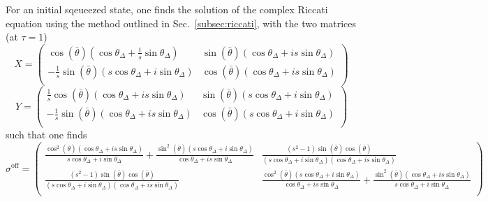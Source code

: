 \documentclass[%
reprint,
superscriptaddress,
nofootinbib,
 amsmath,amssymb,
prx,
floatfix,
]{revtex4-2}
\begin{document}
For an initial sqeueezed state, one finds the solution of the complex Riccati equation using the method outlined in Sec.~\ref{subsec:riccati}, with the two matrices (at $\tau = 1$)
\begin{equation}
    X = \left(
\begin{array}{cc}
 \cos (\bar{\theta}) \left(\cos \theta_\Delta +\frac{i}{s} \sin \theta_\Delta \right) & \sin (\bar{\theta}) (\cos \theta_\Delta +i s \sin \theta_\Delta ) \\
 -\frac{1}{s} \sin (\bar{\theta}) (s \cos \theta_\Delta +i \sin \theta_\Delta ) & \cos (\bar{\theta}) (\cos \theta_\Delta +i s \sin \theta_\Delta ) \\
\end{array}
\right)\nonumber
\end{equation}
\begin{equation}
   Y =  \left(
\begin{array}{cc}
 \frac{1}{s}\cos (\bar{\theta}) (\cos \theta_\Delta +i s \sin \theta_\Delta ) & \sin (\bar{\theta}) (s \cos \theta_\Delta +i \sin \theta_\Delta ) \\
 -\frac{1}{s}\sin (\bar{\theta}) (\cos \theta_\Delta +i s \sin \theta_\Delta ) & \cos (\bar{\theta}) (s \cos \theta_\Delta +i \sin \theta_\Delta ) \\
\end{array}
\right)\nonumber
\end{equation}
such that one finds 
\begin{equation}
    \sigma^{\text{off}} = \left(
\begin{array}{cc}
 \frac{\cos ^2(\bar{\theta}) (\cos \theta_\Delta +i s \sin \theta_\Delta )}{s \cos \theta_\Delta +i \sin \theta_\Delta }+\frac{\sin ^2(\bar{\theta}) (s \cos \theta_\Delta +i \sin \theta_\Delta )}{\cos \theta_\Delta +i s \sin \theta_\Delta } & \frac{\left(s^2-1\right) \sin (\bar{\theta}) \cos (\bar{\theta})}{(s \cos \theta_\Delta +i \sin \theta_\Delta ) (\cos \theta_\Delta +i s \sin \theta_\Delta )} \\
 \frac{\left(s^2-1\right) \sin (\bar{\theta}) \cos (\bar{\theta})}{(s \cos \theta_\Delta +i \sin \theta_\Delta ) (\cos \theta_\Delta +i s \sin \theta_\Delta )} & \frac{\cos ^2(\bar{\theta}) (s \cos \theta_\Delta +i \sin \theta_\Delta )}{\cos \theta_\Delta +i s \sin \theta_\Delta }+\frac{\sin ^2(\bar{\theta}) (\cos \theta_\Delta +i s \sin \theta_\Delta )}{s \cos \theta_\Delta +i \sin \theta_\Delta } \\
\end{array}
\right)
\end{equation}
\end{document}

